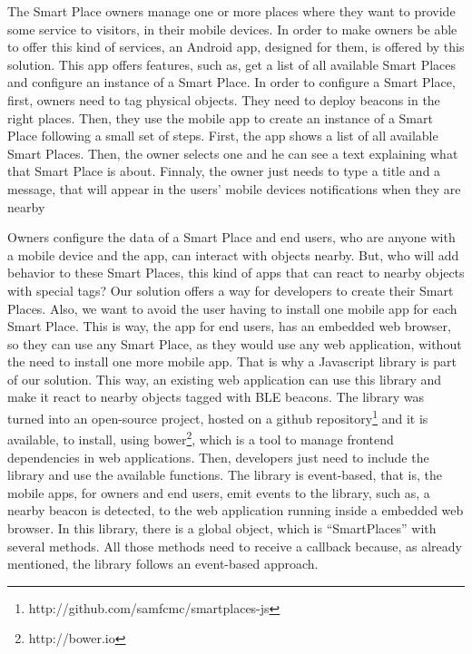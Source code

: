 The Smart Place owners manage one or more places where they want to provide some service to visitors, in their mobile devices.
In order to make owners be able to offer this kind of services, an Android app, designed for them, is offered by this solution.
This app offers features, such as, get a list of all available Smart Places and configure an instance of a Smart Place.
In order to configure a Smart Place, first, owners need to tag physical objects.
They need to deploy beacons in the right places.
Then, they use the mobile app to create an instance of a Smart Place following a small set of steps.
First, the app shows a list of all available Smart Places.
Then, the owner selects one and he can see a text explaining what that Smart Place is about.
Finnaly, the owner just needs to type a title and a message, that will appear in the users' mobile devices notifications when they are nearby

Owners configure the data of a Smart Place and end users, who are anyone with a mobile device and the app, can interact with objects nearby.
But, who will add behavior to these Smart Places, this kind of apps that can react to nearby objects with special tags?
Our solution offers a way for developers to create their Smart Places.
Also, we want to avoid the user having to install one mobile app for each Smart Place.
This is way, the app for end users,
has an embedded web browser, so they can use any Smart Place, as they would use any web application, without the need to install one more mobile app.
That is why a Javascript library is part of our solution.
This way, an existing web application can use this library and make it react to nearby objects tagged with \gls{BLE} beacons.
The library was turned into an open-source project, hosted on a github repository\footnote{http://github.com/samfcmc/smartplaces-js} and it is available, to install, using bower\footnote{http://bower.io}, which is a tool to manage frontend dependencies in web applications.
Then, developers just need to include the library and use the available functions.
The library is event-based, that is, the mobile apps, for owners and end users, emit events to the library, such as, a nearby beacon is detected, to the web application running inside a embedded web browser.
In this library, there is a global object, which is ``SmartPlaces'' with several methods.
All those methods need to receive a callback because, as already mentioned, the library follows an event-based approach.

